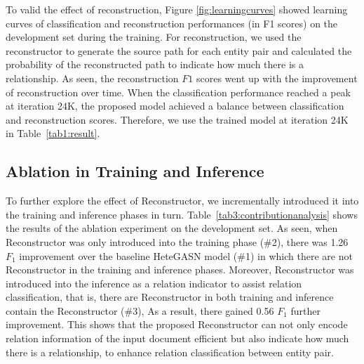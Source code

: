 \documentclass[letterpaper]{article} \usepackage{aaai21}  \usepackage{times}  \usepackage{helvet} \usepackage{courier}  \usepackage[hyphens]{url}  \usepackage{graphicx} \urlstyle{rm} \def\UrlFont{\rm}  \usepackage{natbib}  \usepackage{caption} \frenchspacing  \setlength{\pdfpagewidth}{8.5in}  \setlength{\pdfpageheight}{11in}  \usepackage{amsmath}
\begin{document}
To valid the effect of reconstruction, Figure \ref{fig:learningcurves} showed learning curves of classification and reconstruction performances (in F1 scores) on the development set during the training. 
For reconstruction, we used the reconstructor to generate the source path for each entity pair and calculated the probability of the reconstructed path to indicate how much there is a relationship. 
As seen, the reconstruction $F1$ scores went up with the improvement of reconstruction over time. 
When the classification performance reached a peak at iteration 24K, the proposed model achieved a balance between classification and reconstruction scores. Therefore, we use the trained model at iteration 24K in Table~\ref{tab1:result}.
\subsection{Ablation in Training and Inference}
\begin{table}[h]
	\begin{center}
	\end{center}
	\caption{\label{tab3:contributionanalysis}Ablation of Reconstructor in training and inference.}
\end{table}
To further explore the effect of Reconstructor, we incrementally introduced it into the training and inference phases in turn.
Table~\ref{tab3:contributionanalysis} shows the results of the ablation experiment on the development set.  
As seen, when Reconstructor was only introduced into the training phase (\#2), there was 1.26 $F_1$ improvement over the baseline HeteGASN model (\#1) in which there are not Reconstructor in the training and inference phases.
Moreover, Reconstructor was introduced into the inference as a relation indicator to assist relation classification, that is, there are Reconstructor in both training and inference contain the Reconstructor (\#3), 
As a result, there gained 0.56 $F_1$ further improvement. 
This shows that the proposed Reconstructor can not only encode relation information of the input document efficient but also indicate how much there is a relationship, to enhance relation classification between entity pair.
\end{document}
